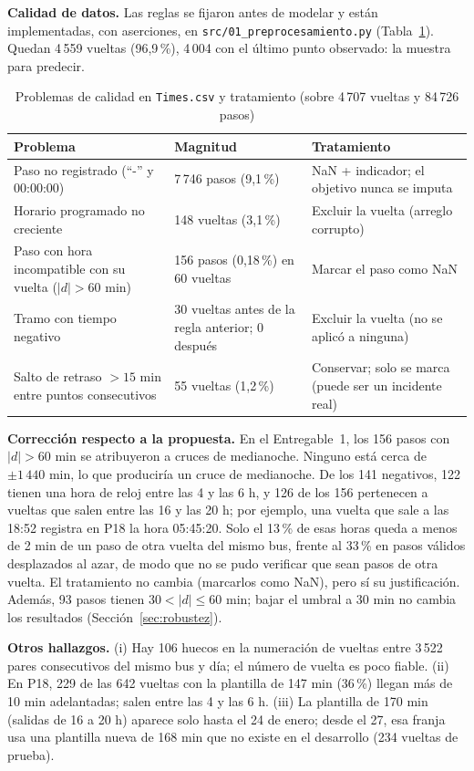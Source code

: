\documentclass[conference,spanish]{IEEEtran}
\begin{document}
\textbf{Calidad de datos.} Las reglas se fijaron antes de modelar y están implementadas, con aserciones, en \texttt{src/01\_preprocesamiento.py} (Tabla~\ref{tab:calidad}). Quedan 4\,559 vueltas (96,9\,\%), 4\,004 con el último punto observado: la muestra para predecir.

\begin{table}[h]
\centering
\caption{Problemas de calidad en \texttt{Times.csv} y tratamiento (sobre 4\,707 vueltas y 84\,726 pasos)}
\label{tab:calidad}
\footnotesize
\begin{tabular}{@{}p{2.3cm}p{2.5cm}p{2.9cm}@{}}
\toprule
\textbf{Problema} & \textbf{Magnitud} & \textbf{Tratamiento}\\
\midrule
Paso no registrado (``-'' y 00:00:00) & 7\,746 pasos (9,1\,\%) & NaN + indicador; el objetivo nunca se imputa\\
Horario programado no creciente & 148 vueltas (3,1\,\%) & Excluir la vuelta (arreglo corrupto)\\
Paso con hora incompatible con su vuelta ($|d|>60$ min) & 156 pasos (0,18\,\%) en 60 vueltas & Marcar el paso como NaN\\
Tramo con tiempo negativo & 30 vueltas antes de la regla anterior; 0 después & Excluir la vuelta (no se aplicó a ninguna)\\
Salto de retraso $>15$ min entre puntos consecutivos & 55 vueltas (1,2\,\%) & Conservar; solo se marca (puede ser un incidente real)\\
\bottomrule
\end{tabular}
\end{table}

\textbf{Corrección respecto a la propuesta.} En el Entregable~1, los 156 pasos con $|d|>60$ min se atribuyeron a cruces de medianoche. Ninguno está cerca de $\pm1\,440$ min, lo que produciría un cruce de medianoche. De los 141 negativos, 122 tienen una hora de reloj entre las 4 y las 6 h, y 126 de los 156 pertenecen a vueltas que salen entre las 16 y las 20 h; por ejemplo, una vuelta que sale a las 18:52 registra en P18 la hora 05:45:20. Solo el 13\,\% de esas horas queda a menos de 2 min de un paso de otra vuelta del mismo bus, frente al 33\,\% en pasos válidos desplazados al azar, de modo que no se pudo verificar que sean pasos de otra vuelta. El tratamiento no cambia (marcarlos como NaN), pero sí su justificación. Además, 93 pasos tienen $30<|d|\le60$ min; bajar el umbral a 30 min no cambia los resultados (Sección~\ref{sec:robustez}).

\textbf{Otros hallazgos.} (i) Hay 106 huecos en la numeración de vueltas entre 3\,522 pares consecutivos del mismo bus y día; el número de vuelta es poco fiable. (ii) En P18, 229 de las 642 vueltas con la plantilla de 147 min (36\,\%) llegan más de 10 min adelantadas; salen entre las 4 y las 6 h. (iii) La plantilla de 170 min (salidas de 16 a 20 h) aparece solo hasta el 24 de enero; desde el 27, esa franja usa una plantilla nueva de 168 min que no existe en el desarrollo (234 vueltas de prueba).
\end{document}

